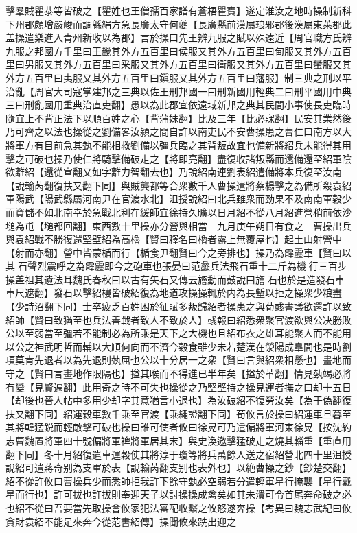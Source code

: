 擊羣賊瞿㳟等皆破之【瞿姓也王僧孺百家譜有蒼梧瞿寶】遂定淮汝之地時操制新科下州郡頗增嚴峻而調緜絹方急長廣太守何夔【長廣縣前漢屬琅邪郡後漢屬東萊郡此盖操遣樂進入青州新收以為郡】言於操曰先王辨九服之賦以殊遠近【周官職方氏辨九服之邦國方千里曰王畿其外方五百里曰侯服又其外方五百里曰甸服又其外方五百里曰男服又其外方五百里曰采服又其外方五百里曰衛服又其外方五百里曰蠻服又其外方五百里曰夷服又其外方五百里曰鎭服又其外方五百里曰藩服】制三典之刑以平治亂【周官大司寇掌建邦之三典以佐王刑邦國一曰刑新國用輕典二曰刑平國用中典三曰刑亂國用重典治直吏翻】愚以為此郡宜依遠域新邦之典其民間小事使長吏臨時隨宜上不背正法下以順百姓之心【背蒲妹翻】比及三年【比必寐翻】民安其業然後乃可齊之以法也操從之劉備畧汝潁之間自許以南吏民不安曹操患之曹仁曰南方以大將軍方有目前急其埶不能相救劉備以彊兵臨之其背叛故宜也備新將紹兵未能得其用擊之可破也操乃使仁將騎擊備破走之【將即亮翻】盡復收諸叛縣而還備還至紹軍陰欲離紹【還從宣翻又如字離力智翻去也】乃說紹南連劉表紹遣備將本兵復至汝南【說輸芮翻復扶又翻下同】與賊龔都等合衆數千人曹操遣將蔡楊擊之為備所殺袁紹軍陽武【陽武縣屬河南尹在官渡水北】沮授說紹曰北兵雖衆而勁果不及南南軍穀少而資儲不如北南幸於急戰北利在緩師宜徐持久曠以日月紹不從八月紹進營稍前依沙塠為屯【塠都回翻】東西數十里操亦分營與相當　九月庚午朔日有食之　曹操出兵與袁紹戰不勝復還堅壁紹為高櫓【賢曰釋名曰櫓者露上無覆屋也】起土山射營中【射而亦翻】營中皆蒙楯而行【楯食尹翻賢曰今之旁排也】操乃為霹靂車【賢曰以其石聲烈震呼之為霹靂即今之砲車也張晏曰范蠡兵法飛石重十二斤為機行三百步操盖祖其遺法耳魏氏春秋曰以古有矢石又傳云旝動而鼓說曰旝石也於是造發石車車尺遮翻】發石以擊紹樓皆破紹復為地道攻操操輒於内為長塹以拒之操衆少粮盡【少詩沼翻下同】士卒疲乏百姓困於征賦多叛歸紹者操患之與荀彧書議欲還許以致紹師【賢曰致猶至也兵法善戰者致人不致於人】彧報曰紹悉衆聚官渡欲與公决勝敗公以至弱當至彊若不能制必為所乘是天下之大機也且紹布衣之雄耳能聚人而不能用以公之神武明哲而輔以大順何向而不濟今穀食雖少未若楚漢在滎陽成臯間也是時劉項莫肯先退者以為先退則埶屈也公以十分居一之衆【賢曰言與紹衆相懸也】畫地而守之【賢曰言畫地作限隔也】搤其喉而不得進已半年矣【搤於革翻】情見埶竭必將有變【見賢遍翻】此用奇之時不可失也操從之乃堅壁持之操見運者撫之曰却十五日【却後也晉人帖中多用少却字其意猶言小退也】為汝破紹不復勞汝矣【為于偽翻復扶又翻下同】紹運穀車數千乘至官渡【乘繩證翻下同】荀攸言於操曰紹運車旦暮至其將韓猛鋭而輕敵擊可破也操曰誰可使者攸曰徐晃可乃遣偏將軍河東徐晃【按沈約志曹魏置將軍四十號偏將軍禆將軍居其末】與史渙邀擊猛破走之燒其輜重【重直用翻下同】冬十月紹復遣車運穀使其將淳于瓊等將兵萬餘人送之宿紹營北四十里沮授說紹可遣蔣奇别為支軍於表【說輸芮翻支别也表外也】以絶曹操之鈔【鈔楚交翻】紹不從許攸曰曹操兵少而悉師拒我許下餘守埶必空弱若分遣輕軍星行掩襲【星行戴星而行也】許可拔也許拔則奉迎天子以討操操成禽矣如其未潰可令首尾奔命破之必也紹不從曰吾要當先取操會攸家犯法審配收繫之攸怒遂奔操【考異曰魏志武紀曰攸貪財袁紹不能足來奔今從范書紹傳】操聞攸來跣出迎之

